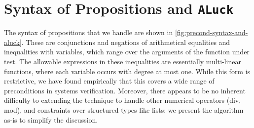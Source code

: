 \documentclass[sigconf,nonacm,review,anonymous]{acmart}
\begin{document}


\section{Syntax of Propositions and \texttt{ALuck}}
\label{sec:luck}

The syntax of propositions that we handle are shown in
\autoref{fig:precond-syntax-and-aluck}. These are conjunctions and negations of
arithmetical equalities and inequalities with variables, which range over
the arguments of the function under test. The allowable expressions in these inequalities are
essentially multi-linear functions, where each variable occurs with degree at
most one. While this form is restrictive, we have found empirically that this covers
a wide range of preconditions in systems verification. Moreover, there
appears to be no inherent difficulty to extending the technique to handle
other numerical operators (div, mod), and constraints over structured types like lists: we present the algorithm as-is to
simplify the discussion.
\end{document}
